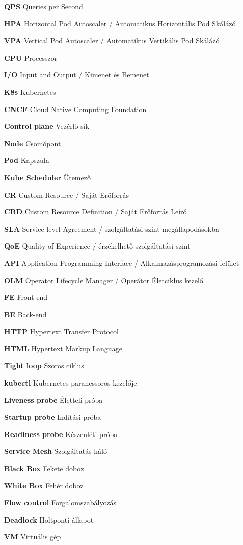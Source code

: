 \begin{multicols}{2}
\textbf{QPS} Queries per Second 

\textbf{HPA} Horizontal Pod Autoscaler / Automatikus Horizontális Pod Skálázó 

\textbf{VPA} Vertical Pod Autoscaler / Automatikus Vertikális Pod Skálázó 

\textbf{CPU} Processzor 

\textbf{I/O} Input and Output / Kimenet és Bemenet 

\textbf{K8s} Kubernetes 

\textbf{CNCF} Cloud Native Computing Foundation 

\textbf{Control plane} Vezérlő sík 

\textbf{Node} Csomópont 

\textbf{Pod} Kapszula 

\textbf{Kube Scheduler} Ütemező 

\textbf{CR} Custom Resource / Saját Erőforrás 

\textbf{CRD} Custom Resource Definition / Saját Erőforrás Leíró

\textbf{SLA} Service-level Agreement / szolgáltatási szint megállapodásokba

\textbf{QoE} Quality of Experience / érzékelhető szolgáltatási szint

\columnbreak

\textbf{API} Application Programming Interface / Alkalmazásprogramozási felület 

\textbf{OLM} Operator Lifecycle Manager / Operátor Életciklus kezelő 

\textbf{FE} Front-end 

\textbf{BE} Back-end 

\textbf{HTTP} Hypertext Transfer Protocol 

\textbf{HTML} Hypertext Markup Language 

\textbf{Tight loop} Szoros ciklus 

\textbf{kubectl} Kubernetes parancssoros kezelője 

\textbf{Liveness probe} Életteli próba 

\textbf{Startup probe} Indítási próba 

\textbf{Readiness probe} Készenléti próba 

\textbf{Service Mesh} Szolgáltatás háló

\textbf{Black Box} Fekete doboz

\textbf{White Box} Fehér doboz

\textbf{Flow control} Forgalomszabályozás

\textbf{Deadlock} Holtponti állapot

\textbf{VM} Virtuális gép


\end{multicols}

